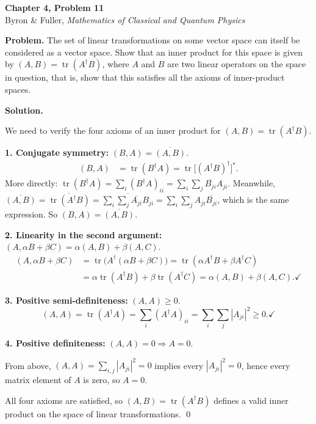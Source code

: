 \documentclass[12pt]{article}
\begin{document}
\begin{center}
{\Large\bfseries Chapter 4, Problem 11}\\[6pt]
Byron \& Fuller, \textit{Mathematics of Classical and Quantum Physics}
\end{center}

\bigskip

\textbf{Problem.} The set of linear transformations on some vector space can itself be considered as a vector space. Show that an inner product for this space is given by $(A, B) = \operatorname{tr}(A^\dagger B)$, where $A$ and $B$ are two linear operators on the space in question, that is, show that this satisfies all the axioms of inner-product spaces.

\bigskip
\textbf{Solution.}

We need to verify the four axioms of an inner product for $(A, B) = \operatorname{tr}(A^\dagger B)$.

\textbf{1. Conjugate symmetry:} $(B, A) = \overline{(A, B)}$.
\begin{align*}
(B, A) &= \operatorname{tr}(B^\dagger A) = \operatorname{tr}\bigl[(A^\dagger B)^\dagger\bigr]^\ast.
\end{align*}
More directly: $\operatorname{tr}(B^\dagger A) = \sum_i (B^\dagger A)_{ii} = \sum_i \sum_j \overline{B_{ji}} A_{ji}$. Meanwhile, $\overline{(A,B)} = \overline{\operatorname{tr}(A^\dagger B)} = \overline{\sum_i\sum_j \overline{A_{ji}}B_{ji}} = \sum_i\sum_j A_{ji}\overline{B_{ji}}$, which is the same expression. So $(B,A) = \overline{(A,B)}$. \checkmark

\textbf{2. Linearity in the second argument:} $(A, \alpha B + \beta C) = \alpha(A, B) + \beta(A, C)$.
\begin{align*}
(A, \alpha B + \beta C) &= \operatorname{tr}\bigl(A^\dagger(\alpha B + \beta C)\bigr) = \operatorname{tr}(\alpha A^\dagger B + \beta A^\dagger C) \\
&= \alpha\operatorname{tr}(A^\dagger B) + \beta\operatorname{tr}(A^\dagger C) = \alpha(A,B) + \beta(A,C). \checkmark
\end{align*}

\textbf{3. Positive semi-definiteness:} $(A, A) \geq 0$.
\[
(A, A) = \operatorname{tr}(A^\dagger A) = \sum_i (A^\dagger A)_{ii} = \sum_i \sum_j |A_{ji}|^2 \geq 0. \checkmark
\]

\textbf{4. Positive definiteness:} $(A, A) = 0 \Rightarrow A = 0$.

From above, $(A, A) = \sum_{i,j} |A_{ji}|^2 = 0$ implies every $|A_{ji}|^2 = 0$, hence every matrix element of $A$ is zero, so $A = 0$. \checkmark

All four axioms are satisfied, so $(A, B) = \operatorname{tr}(A^\dagger B)$ defines a valid inner product on the space of linear transformations. \qed
\end{document}

